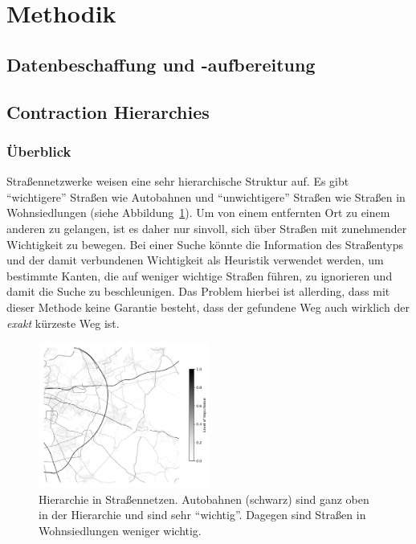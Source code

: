 \section{Methodik}

\subsection{Datenbeschaffung und -aufbereitung}

\subsection{Contraction Hierarchies}
\subsubsection{Überblick}
Straßennetzwerke weisen eine sehr hierarchische Struktur auf. Es gibt "`wichtigere"' Straßen wie \zB Autobahnen
und "`unwichtigere"' Straßen wie \zB Straßen in Wohnsiedlungen (siehe
Abbildung~\ref{fig:road_hierarchy}). Um von einem entfernten Ort zu einem anderen zu gelangen, ist
es daher nur sinvoll, sich über Straßen mit zunehmender Wichtigkeit zu bewegen. Bei einer Suche könnte die
Information des Straßentyps und der damit verbundenen Wichtigkeit als Heuristik verwendet werden, um
bestimmte Kanten, die auf weniger wichtige Straßen führen,  zu ignorieren und damit die Suche zu
beschleunigen. Das Problem hierbei ist allerding, dass mit dieser Methode keine Garantie besteht,
dass der gefundene Weg auch wirklich der \emph{exakt} kürzeste Weg ist.
\begin{figure}[h]
    \centering
    \includegraphics[width=0.5\textwidth]{figures/road_hierarchy.png}
    \caption[Hierarchie in Straßennetzen]{Hierarchie in Straßennetzen. Autobahnen (schwarz) sind
        ganz oben in der Hierarchie und sind sehr "`wichtig"'. Dagegen sind Straßen in
        Wohnsiedlungen weniger wichtig. \osmcr}
    \label{fig:road_hierarchy}
\end{figure}
